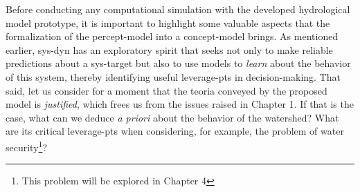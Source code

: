 \documentclass[./main_en.tex]{subfiles}
\begin{document}
\par Before conducting any computational simulation with the developed hydrological \gls{model} prototype, it is important to highlight some valuable aspects that the formalization of the \gls{percept-model} into a \gls{concept-model} brings. As mentioned earlier, \gls{sys-dyn} has an exploratory spirit that seeks not only to make reliable predictions about a \gls{sys-target} but also to use models to \textit{learn} about the behavior of this \gls{system}, thereby identifying useful \gls{leverage-pts} in decision-making. That said, let us consider for a moment that the \gls{teoria} conveyed by the proposed \gls{model} is \textit{justified}, which frees us from the issues raised in Chapter 1. If that is the case, what can we deduce \textit{a priori} about the behavior of the watershed? What are its critical \gls{leverage-pts} when considering, for example, the problem of water security\footnote{This problem will be explored in Chapter 4}?
\end{document}
